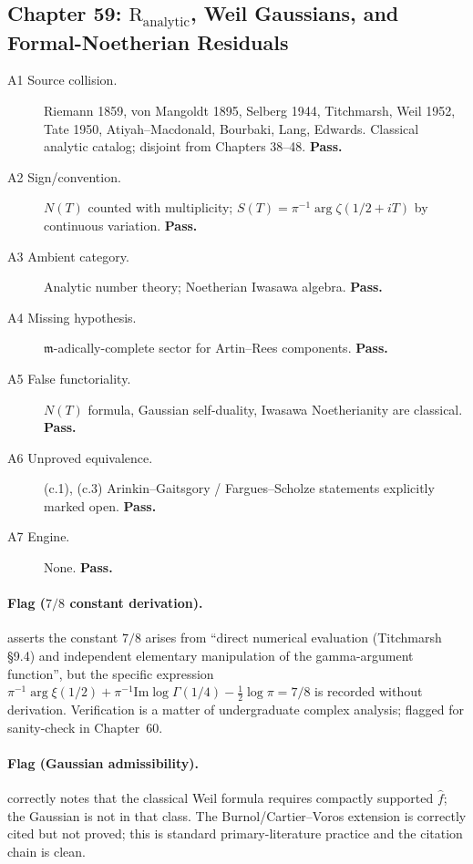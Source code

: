 \subsection{Chapter 59: \(\mathrm{R}_{\mathrm{analytic}}\), Weil Gaussians, and Formal-Noetherian Residuals}
\label{v4-arith:w6-j:ch59}

\begin{description}
\item[A1 Source collision.] Riemann 1859, von Mangoldt 1895,
Selberg 1944, Titchmarsh, Weil 1952, Tate 1950, Atiyah--Macdonald,
Bourbaki, Lang, Edwards. Classical analytic catalog; disjoint from
Chapters 38--48. \textbf{Pass.}
\item[A2 Sign/convention.] \(N(T)\) counted with multiplicity;
\(S(T)=\pi^{-1}\arg\zeta(1/2+iT)\) by continuous variation.
\textbf{Pass.}
\item[A3 Ambient category.] Analytic number theory; Noetherian
Iwasawa algebra. \textbf{Pass.}
\item[A4 Missing hypothesis.] \(\mathfrak{m}\)-adically-complete
sector for Artin--Rees components. \textbf{Pass.}
\item[A5 False functoriality.] \(N(T)\) formula, Gaussian
self-duality, Iwasawa Noetherianity are classical. \textbf{Pass.}
\item[A6 Unproved equivalence.] (c.1), (c.3) Arinkin--Gaitsgory /
Fargues--Scholze statements explicitly marked open.
\textbf{Pass.}
\item[A7 Engine.] None. \textbf{Pass.}
\end{description}

\paragraph{Flag (\(7/8\) constant derivation).}
 asserts the constant \(7/8\) arises from
``direct numerical evaluation (Titchmarsh \S 9.4) and independent
elementary manipulation of the gamma-argument function'', but the
specific expression \(\pi^{-1}\arg\xi(1/2)+\pi^{-1}\mathrm{Im}\log\Gamma(1/4)-\tfrac{1}{2}\log\pi=7/8\)
is recorded without derivation. Verification is a matter of
undergraduate complex analysis; flagged for sanity-check in
Chapter~60.

\paragraph{Flag (Gaussian admissibility).}
 correctly notes that
the classical Weil formula requires compactly supported
\(\widehat{f}\); the Gaussian is not in that class. The
Burnol/Cartier--Voros extension is correctly cited but not proved;
this is standard primary-literature practice and the citation
chain is clean.

